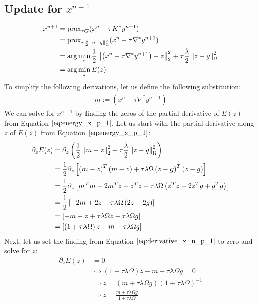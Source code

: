 \subsection{Update for $x^{n+1}$}
\begin{align}
x^{n+1} &= \text{prox}_{\tau G}(x^n - \tau K^* y^{n+1}) \\
		&= \text{prox}_{\tau \frac{\lambda}{2} \left\lVert u - g\right\rVert_{\Omega}^2 }(x^n - \tau \nabla^* y^{n+1}) \\
	    &= \arg \min_{z} \frac{1}{2} \left\lVert\left(x^n - \tau \nabla^* y^{n+1} \right) - z\right\rVert_2^2 + \tau \frac{\lambda}{2}\left\lVert z - g\right\rVert_{\Omega}^2 \\
	    &= \arg \min_{z} E(z)
\label{eq:energy_x_p_1}	    
\end{align}
To simplify the following derivations, let us define the following substitution: 
\begin{align}
	m := \left(x^n - \tau \nabla^* y^{n+1} \right)
\end{align}
We can solve for $x^{n+1}$ by finding the zeros of the partial derivative of $E(z)$ from Equation $\ref{eq:energy_x_p_1}$. Let us start with the partial derivative along $z$ of $E(z)$ from Equation $\ref{eq:energy_x_p_1}$: 
\begin{align}
	\partial_{z} E(z)
	&= \partial_{z} \left( \frac{1}{2} \left\lVert m - z\right\rVert_2^2 + \tau \frac{\lambda}{2}\left\lVert z - g\right\rVert_{\Omega}^2 \right) \nonumber \\
	&= \frac{1}{2} \partial_{z} \left[ \left( m - z \right)^{T}\left( m - z \right) + \tau \lambda \Omega \left( z -g \right)^{T}\left( z -g \right) \right] \nonumber \\
	&= \frac{1}{2} \partial_{z} \left[ m^{T}m -2m^{T} z + z^{T} z + \tau \lambda \Omega \left( z^{T}z -2z^{T} g + g^{T} g\right) \right] \nonumber \\
	&= \frac{1}{2} \left[ -2m + 2z + \tau \lambda \Omega \left( 2 z -2g \right) \right] \nonumber \\
	&= \left[ -m + z + \tau \lambda \Omega z - \tau \lambda \Omega g \right]	 \nonumber \\	
	&= \left[ \left(1+\tau \lambda \Omega \right)z-m - \tau \lambda \Omega g \right]	 \nonumber \\
\label{eq:derivative_x_n_p_1}		
\end{align}
Next, let us set the finding from Equation $\ref{eq:derivative_x_n_p_1}$ to zero and solve for $z$:
\begin{align}
	\partial_{z} E(z) 
	&= 0 \nonumber \\
	&\Leftrightarrow \left(1+\tau \lambda \Omega \right)z-m - \tau \lambda \Omega g = 0 \nonumber \\
	&\Rightarrow z = \left(m +  \tau \lambda \Omega g \right) \left( 1+\tau \lambda \Omega\right)^{-1} \nonumber \\
	&\Rightarrow z = \frac{m +  \tau \lambda \Omega g}{1+\tau \lambda \Omega} \nonumber \\
\label{eq:zeros_ez}	
\end{align}
